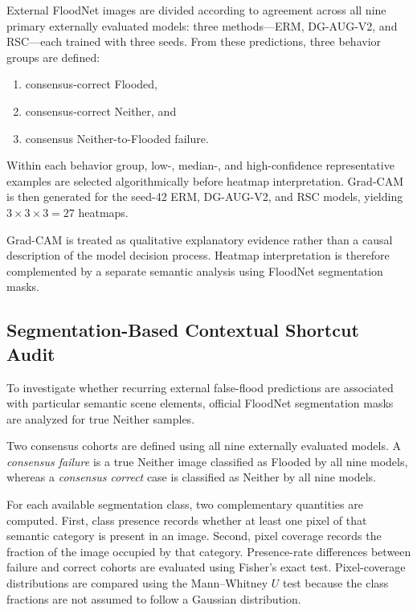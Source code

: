 External FloodNet images are divided according to agreement across all
nine primary externally evaluated models: three methods---ERM,
DG-AUG-V2, and RSC---each trained with three seeds. From these predictions,
three behavior groups are defined:

\begin{enumerate}
    \item consensus-correct Flooded,
    \item consensus-correct Neither, and
    \item consensus Neither-to-Flooded failure.
\end{enumerate}

Within each behavior group, low-, median-, and high-confidence
representative examples are selected algorithmically before heatmap
interpretation. Grad-CAM is then generated for the seed-42 ERM,
DG-AUG-V2, and RSC models, yielding \(3\times3\times3=27\) heatmaps.

Grad-CAM is treated as qualitative explanatory evidence rather than a
causal description of the model decision process. Heatmap interpretation
is therefore complemented by a separate semantic analysis using FloodNet
segmentation masks.

\subsection{Segmentation-Based Contextual Shortcut Audit}

To investigate whether recurring external false-flood predictions are
associated with particular semantic scene elements, official FloodNet
segmentation masks are analyzed for true Neither samples.

Two consensus cohorts are defined using all nine externally evaluated
models. A \emph{consensus failure} is a true Neither image classified as
Flooded by all nine models, whereas a \emph{consensus correct} case is
classified as Neither by all nine models.

For each available segmentation class, two complementary quantities are
computed. First, class presence records whether at least one pixel of that
semantic category is present in an image. Second, pixel coverage records
the fraction of the image occupied by that category. Presence-rate
differences between failure and correct cohorts are evaluated using
Fisher's exact test. Pixel-coverage distributions are compared using the
Mann--Whitney \(U\) test because the class fractions are not assumed to
follow a Gaussian distribution.

